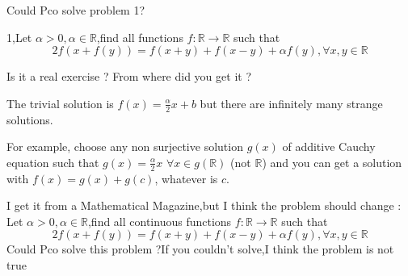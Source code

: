 \begin{solution}
	Could Pco solve  problem 1?
\end{solution}



\begin{solution}
	\begin{tcolorbox}1,Let $\alpha >0,\alpha \in\mathbb{R}$,find all functions $f:\mathbb{R}\to\mathbb{R}$ such that \[ 2 f(x+f(y))=f(x+y)+f(x-y)+\alpha f(y),\forall x,y\in \mathbb{R}\] \end{tcolorbox}
Is it a real exercise ? From where did you get it ?

The trivial solution is $f(x)=\frac{\alpha}2x+b$ but there are infinitely many strange solutions.

For example, choose any non surjective solution $g(x)$ of additive Cauchy equation such that $g(x)=\frac{\alpha}2x$ $\forall x\in g(\mathbb R)$ (not $\mathbb R$) and you can get a solution with $f(x)=g(x)+g(c)$, whatever is $c$.
\end{solution}



\begin{solution}
	I get it from a Mathematical Magazine,but I think the problem should change :
Let $\alpha >0,\alpha \in\mathbb{R}$,find all  continuous functions $f:\mathbb{R}\to\mathbb{R}$ such that \[ 2 f(x+f(y))=f(x+y)+f(x-y)+\alpha f(y),\forall x,y\in \mathbb{R}\] 
Could Pco solve this problem ?If you couldn't solve,I think the problem is not true
\end{solution}



